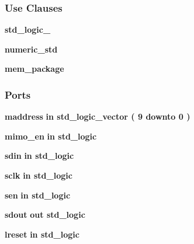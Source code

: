 \subsubsection*{Use Clauses}
 \begin{DoxyCompactItemize}
\item 
{\bf std\+\_\+logic\+\_}   
\item 
{\bf numeric\+\_\+std}   
\item 
{\bf mem\+\_\+package}   
\end{DoxyCompactItemize}
\subsubsection*{Ports}
 \begin{DoxyCompactItemize}
\item 
{\bf maddress}  {\bfseries {\bfseries \textcolor{keywordflow}{in}\textcolor{vhdlchar}{ }}} {\bfseries \textcolor{comment}{std\+\_\+logic\+\_\+vector}\textcolor{vhdlchar}{ }\textcolor{vhdlchar}{(}\textcolor{vhdlchar}{ }\textcolor{vhdlchar}{ } \textcolor{vhdldigit}{9} \textcolor{vhdlchar}{ }\textcolor{keywordflow}{downto}\textcolor{vhdlchar}{ }\textcolor{vhdlchar}{ } \textcolor{vhdldigit}{0} \textcolor{vhdlchar}{ }\textcolor{vhdlchar}{)}\textcolor{vhdlchar}{ }} 
\item 
{\bf mimo\+\_\+en}  {\bfseries {\bfseries \textcolor{keywordflow}{in}\textcolor{vhdlchar}{ }}} {\bfseries \textcolor{comment}{std\+\_\+logic}\textcolor{vhdlchar}{ }} 
\item 
{\bf sdin}  {\bfseries {\bfseries \textcolor{keywordflow}{in}\textcolor{vhdlchar}{ }}} {\bfseries \textcolor{comment}{std\+\_\+logic}\textcolor{vhdlchar}{ }} 
\item 
{\bf sclk}  {\bfseries {\bfseries \textcolor{keywordflow}{in}\textcolor{vhdlchar}{ }}} {\bfseries \textcolor{comment}{std\+\_\+logic}\textcolor{vhdlchar}{ }} 
\item 
{\bf sen}  {\bfseries {\bfseries \textcolor{keywordflow}{in}\textcolor{vhdlchar}{ }}} {\bfseries \textcolor{comment}{std\+\_\+logic}\textcolor{vhdlchar}{ }} 
\item 
{\bf sdout}  {\bfseries {\bfseries \textcolor{keywordflow}{out}\textcolor{vhdlchar}{ }}} {\bfseries \textcolor{comment}{std\+\_\+logic}\textcolor{vhdlchar}{ }} 
\item 
{\bf lreset}  {\bfseries {\bfseries \textcolor{keywordflow}{in}\textcolor{vhdlchar}{ }}} {\bfseries \textcolor{comment}{std\+\_\+logic}\textcolor{vhdlchar}{ }} 
\item 

\end{DoxyCompactItemize}
